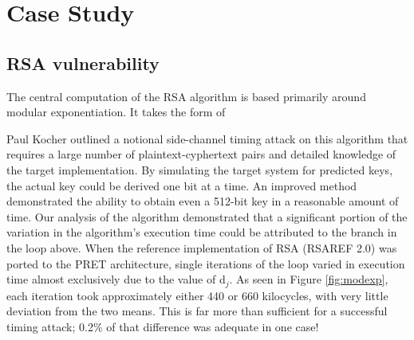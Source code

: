 \documentclass[times, 10pt,twocolumn]{article}
\begin{document}
\section{Case Study}
\subsection{RSA vulnerability}
The central computation of the RSA algorithm is based primarily around modular exponentiation.  It takes the form of 

\begin{center}\end{center}

Paul Kocher outlined\cite{Kocher96timingattacks} a notional side-channel timing attack on this algorithm that requires a large number of plaintext-cyphertext pairs and detailed knowledge of the target implementation.  By simulating the target system for predicted keys, the actual key could be derived one bit at a time.  An improved method \cite{DKLMQW98} demonstrated the ability to obtain even a 512-bit key in a reasonable amount of time.  Our analysis of the algorithm demonstrated that a significant portion of the variation in the algorithm's execution time could be attributed to the branch in the loop above.  When the reference implementation of RSA (RSAREF 2.0) was ported to the PRET architecture, single iterations of the loop varied in execution time almost exclusively due to the value of d$_{j}$.  As seen in Figure \ref{fig:modexp}, each iteration took approximately either 440 or 660 kilocycles, with very little deviation from the two means.  This is far more than sufficient for a successful timing attack; 0.2\% of that difference was adequate in one case! \cite{DKLMQW98}
\end{document}
